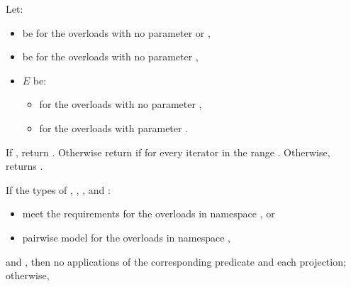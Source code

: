 \begin{itemdescr}
\pnum
{}

\begin{addedblock}
\pnum
Let:
\begin{itemize}
\item {} be  for the overloads with no parameter  or ,

\item {} be  for the overloads with no parameter ,

\item $E$ be:
\begin{itemize}
\item {} for the overloads with no parameter ,
\item {} for the overloads with parameter .
\end{itemize}
\end{itemize}
\end{addedblock}

\pnum
\returns
If
,
return
.
Otherwise return
if  for every iterator
in the range 
.
Otherwise, returns
.

\pnum
\complexity
\begin{addedblock}
If the types of , , , and :
\begin{itemize}
\item meet the 
  requirements
  for the overloads in namespace , or
\item pairwise model  for the
overloads in namespace ,
\end{itemize}
and
,
then
no applications of the corresponding predicate and each projection; otherwise,
\end{addedblock}


\end{itemdescr}
